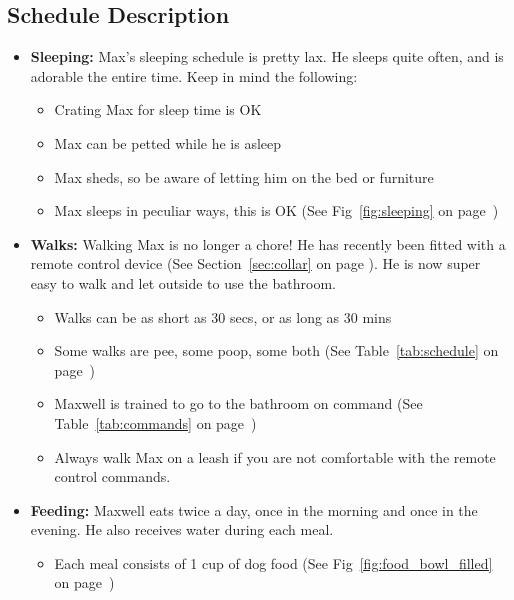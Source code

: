 \documentclass[pdftex,12pt]{article}
\begin{document}
\pagebreak

\subsection{Schedule Description}
\begin{itemize}\label{itm:schedule}
    \item \textbf{Sleeping:} Max's sleeping schedule is pretty lax. He sleeps
        quite often, and is adorable the entire time. Keep in mind the following:
        \begin{itemize}
            \item Crating Max for sleep time is OK
            \item Max can be petted while he is asleep
            \item Max sheds, so be aware of letting him on the bed or furniture
            \item Max sleeps in peculiar ways, this is OK
                (See Fig~\ref{fig:sleeping} on page~\pageref{fig:sleeping})
        \end{itemize}
    \item \textbf{Walks:} Walking Max is no longer a chore! He has recently been fitted
        with a remote control device (See Section~\ref{sec:collar} on page \pageref{sec:collar}).
        He is now super easy to walk and let outside to use the bathroom.
        \begin{itemize}
            \item Walks can be as short as 30 secs, or as long as 30 mins
            \item Some walks are pee, some poop, some both
                (See Table~\ref{tab:schedule} on page~\pageref{tab:schedule})
            \item Maxwell is trained to go to the bathroom on command
                (See Table~\ref{tab:commands} on page~\pageref{tab:commands})
            \item Always walk Max on a leash if you are not comfortable with the remote control commands.
        \end{itemize}
    \item \textbf{Feeding:} Maxwell eats twice a day, once in the morning and
        once in the evening. He also receives water during each meal.
        \begin{itemize}
            \item Each meal consists of 1 cup of dog food
                (See Fig~\ref{fig:food_bowl_filled} on
                page~\pageref{fig:food_bowl_filled})

\end{itemize}
\end{itemize}
\end{document}
